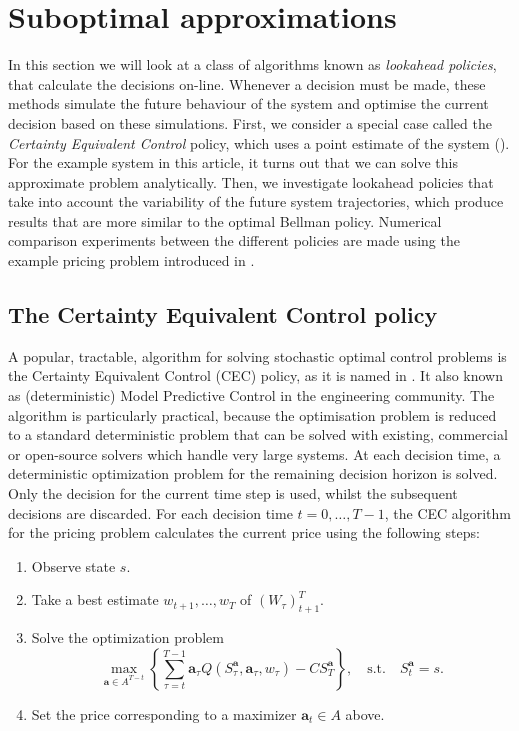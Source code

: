 \documentclass[main.tex]{subfiles}
\begin{document}
\listoftodos

\section{Suboptimal
  approximations}\label{sec:suboptimal_approximations}
In this section we will look at a class of algorithms known as
\emph{lookahead policies}, that calculate the decisions on-line.
Whenever a decision must be made, these methods simulate the future
behaviour of the system and optimise the current decision based on
these simulations. First, we consider a special case called the
\emph{Certainty Equivalent Control} policy, which uses a point
estimate of the system (\citet[Ch.~6]{bertsekas2005dynamic}). For the
example system in this article, it turns out that we can solve
this approximate problem analytically.
Then, we investigate lookahead policies that take into account the
variability of the future system trajectories, which produce
results that are more similar to the optimal Bellman policy.
Numerical comparison experiments between the different policies are
made using the example pricing problem introduced in
.

\subsection{The Certainty Equivalent Control policy}
A popular, tractable, algorithm for solving stochastic optimal control
problems is the Certainty Equivalent Control (CEC) policy, as it is
named in \citet{bertsekas2005dynamic}.
It also known as (deterministic) Model
Predictive Control in the engineering community.
The algorithm is particularly practical, because the optimisation
problem is reduced to a standard deterministic problem that can
be solved with existing, commercial or open-source solvers which
handle very large systems.
At each decision time, a deterministic optimization problem for the
remaining decision horizon is solved. Only the decision for the
current time step is
used, whilst the subsequent decisions are discarded.
For each decision time $t=0,\dots,T-1$, the CEC algorithm for the pricing
problem calculates the current price using the following steps:
\begin{enumerate}
\item Observe state $s$.
\item Take a best estimate $w_{t+1},\dots,w_T$ of ${(W_\tau)}_{t+1}^T$.
\item Solve the optimization problem
  \begin{equation}
    \max_{\mathbf a\in A^{T-t}}\left\{\sum_{\tau=t}^{T-1}\mathbf
      a_\tau Q(S_\tau^{\mathbf a},\mathbf
      a_\tau,w_{\tau})-CS_T^{\mathbf a}\right\},
    \quad \text{s.t.}\quad S_t^{\mathbf a}=s.
  \end{equation}
\item Set the price corresponding to a maximizer
  $\mathbf a_t\in A$ above.
\end{enumerate}
\end{document}
